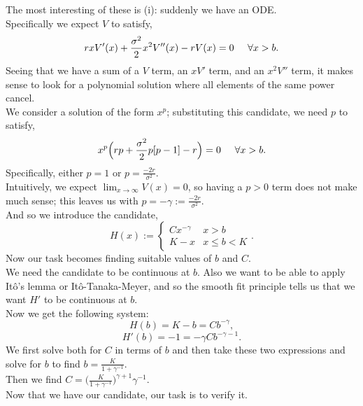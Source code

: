 \documentclass[12pt]{article}
\newcommand{\spc}{\hspace{7 px}}
\theoremstyle{definition}
\begin{document}
The most interesting of these is (i): suddenly we have an ODE. \\
Specifically we expect $V$ to satisfy,
\[
    rx V'(x) + \frac{\sigma^2}{2} x^2 V''(x) - r V(x) = 0 \spc \spc \forall x > b.
\]
Seeing that we have a sum of a $V$ term, an $x V'$ term, and an $x^2 V''$ term, it makes sense to look for a polynomial solution where all elements of the same power cancel. \\
We consider a solution of the form $x^p$; substituting this candidate, we need $p$ to satisfy,
\[
    x^p \Big ( rp + \frac{\sigma^2}{2} p [p-1] - r \Big ) = 0 \spc \spc \forall x > b.
\]
Specifically, either $p = 1$ or $p = \frac{- 2 r}{\sigma^2}$. \\
Intuitively, we expect $\lim_{x \to \infty} V(x) = 0$, so having a $p > 0$ term does not make much sense; this leaves us with $p = -\gamma := \frac{-2 r}{\sigma^2}$. \\
And so we introduce the candidate,
\[
    H (x) := \begin{cases}
        C x^{-\gamma} & x > b \\
        K - x                & x \leq b < K
    \end{cases}.
\]
Now our task becomes finding suitable values of $b$ and $C$. \\
We need the candidate to be continuous at $b$. Also we want to be able to apply Itô's lemma or Itô-Tanaka-Meyer, and so the smooth fit principle tells us that we want $H'$ to be continuous at $b$. \\
Now we get the following system:
\[
    H(b) = K - b = C b^{-\gamma},
\]
\[
    H'(b) = -1 = - \gamma C b^{-\gamma - 1}.
\]
We first solve both for $C$ in terms of $b$ and then take these two expressions and solve for $b$ to find $b = \frac{K}{1 + \gamma^{-1}}$. \\
Then we find $C = \Big ( \frac{K}{1 + \gamma^{-1}} \Big )^{\gamma + 1} \gamma^{-1}$. \\
Now that we have our candidate, our task is to verify it. \\
\end{document}
